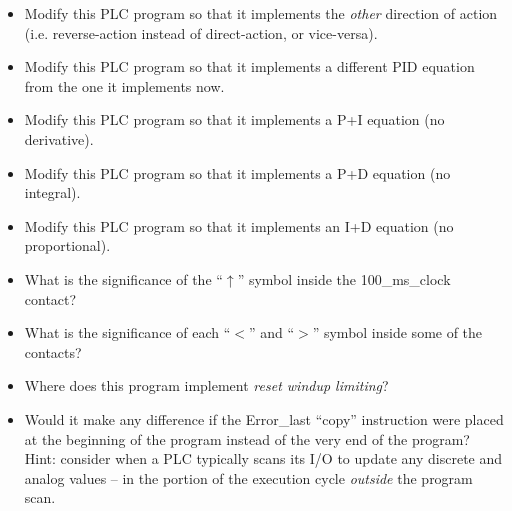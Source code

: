 \begin{itemize}
\item{} Modify this PLC program so that it implements the {\it other} direction of action (i.e. reverse-action instead of direct-action, or vice-versa).
\item{} Modify this PLC program so that it implements a different PID equation from the one it implements now.
\item{} Modify this PLC program so that it implements a P+I equation (no derivative).
\item{} Modify this PLC program so that it implements a P+D equation (no integral).
\item{} Modify this PLC program so that it implements an I+D equation (no proportional).
\item{} What is the significance of the ``$\uparrow$'' symbol inside the 100\_ms\_clock contact?
\item{} What is the significance of each ``$<$'' and ``$>$'' symbol inside some of the contacts?
\item{} Where does this program implement {\it reset windup limiting}?
\item{} Would it make any difference if the Error\_last ``copy'' instruction were placed at the beginning of the program instead of the very end of the program?  Hint: consider when a PLC typically scans its I/O to update any discrete and analog values -- in the portion of the execution cycle {\it outside} the program scan.
\end{itemize}














